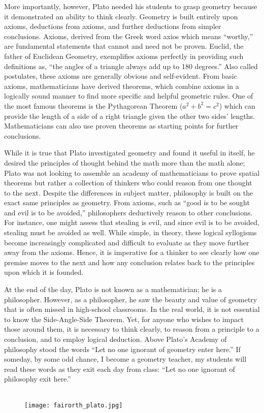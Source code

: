 More importantly, however, Plato needed his students to grasp geometry because it demonstrated an ability to think clearly. Geometry is built entirely upon axioms, deductions from axioms, and further deductions from simpler conclusions. Axioms, derived from the Greek word axios which means “worthy,” are fundamental statements that cannot and need not be proven. Euclid, the father of Euclidean Geometry, exemplifies axioms perfectly in providing such definitions as, “the angles of a triangle always add up to 180 degrees.” Also called postulates, these axioms are generally obvious and self-evident. From basic axioms, mathematicians have derived theorems, which combine axioms in a logically sound manner to find more specific and helpful geometric rules. One of the most famous theorems is the Pythagorean Theorem ($a^2 + b^2 = c^2$) which can provide the length of a side of a right triangle given the other two sides’ lengths. Mathematicians can also use proven theorems as starting points for further conclusions. 

While it is true that Plato investigated geometry and found it useful in itself, he desired the principles of thought behind the math more than the math alone; Plato was not looking to assemble an academy of mathematicians to prove spatial theorems but rather a collection of thinkers who could reason from one thought to the next. Despite the differences in subject matter, philosophy is built on the exact same principles as geometry. From axioms, such as “good is to be sought and evil is to be avoided,” philosophers deductively reason to other conclusions. For instance, one might assess that stealing is evil, and since evil is to be avoided, stealing must be avoided as well. While simple, in theory, these logical syllogisms become increasingly complicated and difficult to evaluate as they move further away from the axioms. Hence, it is imperative for a thinker to see clearly how one premise moves to the next and how any conclusion relates back to the principles upon which it is founded. 

At the end of the day, Plato is not known as a mathematician; he is a philosopher. However, as a philosopher, he saw the beauty and value of geometry that is often missed in high-school classrooms. In the real world, it is not essential to know the Side-Angle-Side Theorem. Yet, for anyone who wishes to impact those around them, it is necessary to think clearly, to reason from a principle to a conclusion, and to employ logical deduction. Above Plato’s Academy of philosophy stood the words “Let no one ignorant of geometry enter here.” If someday, by some odd chance, I become a geometry teacher, my students will read these words as they exit each day from class: “Let no one ignorant of philosophy exit here.”\\\\

\begin{figure}[h]
  \begin{center}
    \texttt{[image: fairorth\_plato.jpg]}
  \end{center}
\end{figure}
